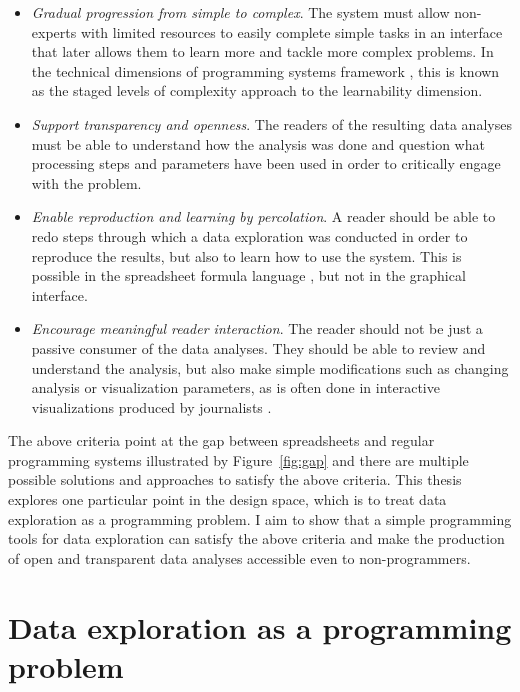 \documentclass[fleqn,11pt]{report}
\begin{document}
\begin{itemize}
\item \emph{Gradual progression from simple to complex}. The system must allow non-experts with
limited resources to easily complete simple tasks in an interface that later allows them to
learn more and tackle more complex problems. In the technical dimensions of programming systems
framework \citep{jakubovic-2023-techdims}, this is known as the staged levels of complexity
approach to the learnability dimension.

\item \emph{Support transparency and openness}. The readers of the resulting data analyses must
be able to understand how the analysis was done and question what processing steps and parameters
have been used in order to critically engage with the problem.

\item \emph{Enable reproduction and learning by percolation}. A reader should be able to
redo steps through which a data exploration was conducted in order to reproduce the results, but
also to learn how to use the system. This is possible in the spreadsheet formula language
\citep{sarkar-2018-spreadsheets}, but not in the graphical interface.

\item \emph{Encourage meaningful reader interaction}. The reader should not be just a passive
consumer of the data analyses. They should be able to review and understand the analysis, but
also make simple modifications such as changing analysis or visualization parameters,
as is often done in interactive visualizations produced by journalists \citep{kennedy-2021-engagements}.
\end{itemize}

The above criteria point at the gap between spreadsheets and regular programming systems
illustrated by Figure~\ref{fig:gap} and there are multiple possible solutions and approaches to
satisfy the above criteria. This thesis explores one particular point in the design space,
which is to treat data exploration as a programming problem. I aim to show that a simple programming
tools for data exploration can satisfy the above criteria and make the production of
open and transparent data analyses accessible even to non-programmers.

\section{Data exploration as a programming problem}
\end{document}
